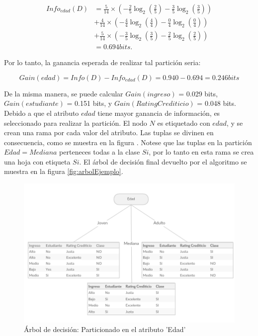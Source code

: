 \begin{equation*}
\begin{split}
Info_{edad}(D) & = \frac{5}{14} \times ( -\frac{2}{5}\log_2(\frac{2}{5})-\frac{3}{5}\log_2(\frac{3}{5})  ) \\
			   & + \frac{4}{14} \times ( -\frac{4}{4}\log_2(\frac{4}{4})-\frac{0}{4}\log_2(\frac{0}{4})  ) \\
			   & + \frac{5}{14} \times ( -\frac{3}{5}\log_2(\frac{3}{5})-\frac{2}{5}\log_2(\frac{2}{5})  ) \\
			   & = 0.694 bits.
\end{split}
\end{equation*}

Por lo tanto, la ganancia esperada de realizar tal partición seria:

\begin{equation*}
Gain(edad) = Info(D) - Info_{edad}(D) = 0.940 - 0.694 = 0.246 bits
\end{equation*}

De la misma manera, se puede calcular $Gain(ingreso)$ = 0.029 bits, $Gain(estudiante)$ = 0.151 bits, y $Gain(RatingCrediticio)$ = 0.048 bits. Debido a que el atributo $edad$ tiene mayor ganancia de información, es seleccionado para realizar la partición. El nodo $N$ es etiquetado con $edad$, y se crean una rama por cada valor del atributo. Las tuplas se divinen en consecuencia, como se muestra en la figura . Notese que las tuplas en la partición $Edad = Mediana$ perteneces todas a la clase $Si$, por lo tanto en esta rama se crea una hoja con etiqueta $Si$. El árbol de decisión final devuelto por el algoritmo se muestra en la figura \ref{fig:arbolEjemplo}.

\begin{figure}[!htbp]
	\centering
	\includegraphics[width=0.7\linewidth]{capitulo-3/graphics/dtree_parti}
	\caption[Árbol de decisión]{Árbol de decisión: Particionado en el atributo 'Edad'}
	\label{fig:arbolPartEdad}
\end{figure}

